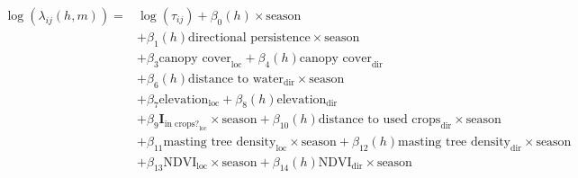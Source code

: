 \documentclass[a4paper]{article}
\begin{document}
\begin{align}
  \log(\lambda_{ij}(h, m)) = & \log(\tau_{ij}) + \beta_0(h) \times \text{season} \\
  & + \beta_1(h) \text{directional persistence} \times \text{season} \\
  & + \beta_{3} \text{canopy cover}_{\text{loc}} + \beta_{4}(h) \text{canopy cover}_{\text{dir}} \\
  & + \beta_6(h) \text{distance to water}_{\text{dir}} \times \text{season} \\
  & + \beta_7 \text{elevation}_{\text{loc}} + \beta_8(h) \text{elevation}_{\text{dir}} \\
  & + \beta_9\mathbf{I}_{\text{in crops?}_{\text{loc}}} \times \text{season} + \beta_{10}(h) \text{distance to used crops}_{\text{dir}} \times \text{season} \\
  & + \beta_{11} \text{masting tree density}_{\text{loc}} \times \text{season} + \beta_{12}(h) \text{masting tree density}_{\text{dir}} \times \text{season} \\
  & + \beta_{13} \text{NDVI}_{\text{loc}} \times \text{season} + \beta_{14}(h) \text{NDVI}_{\text{dir}} \times \text{season}
\end{align}
\end{document}
